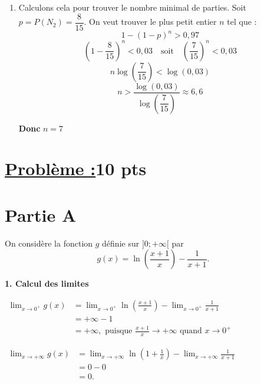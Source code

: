 \documentclass[12pt,a4paper]{article}
\begin{document}
\begin{enumerate}
\begin{enumerate}
          \end{enumerate}
    \item Calculons cela pour trouver le nombre minimal de parties.
          Soit \( p = P(N_2) = \dfrac{8}{15} \). On veut trouver le plus petit entier \( n \) tel que :
          \[
              1 - (1 - p)^n > 0{,}97
          \]
          \[
              (1 - \dfrac{8}{15})^n < 0{,}03 \quad \text{soit} \quad \left( \dfrac{7}{15} \right)^n < 0{,}03
          \]
          \[
              n \log\left( \dfrac{7}{15} \right) < \log(0{,}03)
          \]
          \[
              n > \dfrac{\log(0{,}03)}{\log\left( \dfrac{7}{15} \right)} \approx 6{,}6
          \]

          \textbf{Donc } \( n = 7 \)

\end{enumerate}
\section*{\underline{Problème :}\quad\textbf{10 pts}}
\section*{Partie A}

On considère la fonction \( g \) définie sur \( ]0; +\infty[ \) par
\[
    g(x) = \ln\left( \frac{x+1}{x} \right) - \frac{1}{x+1}.
\]

\bigskip

\textbf{1. Calcul des limites}

\(
\begin{aligned}
    \lim_{x \to 0^{+}} g(x)
     & = \lim_{x \to 0^{+}} \ln\left( \frac{x+1}{x} \right) - \lim_{x \to 0^{+}} \frac{1}{x+1} \\
     & = +\infty - 1                                                                           \\
     & = +\infty,\text{ puisque }  \frac{x+1}{x} \to +\infty  \text{ quand } x \to 0^{+}
\end{aligned}
\)

\(
\begin{aligned}
    \lim_{x \to +\infty} g(x)
     & = \lim_{x \to +\infty} \ln\left( 1 + \frac{1}{x} \right) - \lim_{x \to +\infty} \frac{1}{x+1} \\
     & = 0 - 0                                                                                       \\
     & = 0.
\end{aligned}
\)
\end{document}

